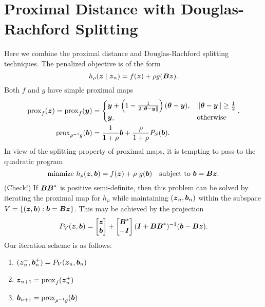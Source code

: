 \documentclass{article}
\begin{document}
\section*{\center Proximal Distance with Douglas-Rachford Splitting}
Here we combine the proximal distance and Douglas-Rachford splitting techniques.
The penalized objective is of the form
\begin{equation*}
    h_{\rho}(\boldsymbol{z} \mid \boldsymbol{z}_{n})
    =
    f(\boldsymbol{z})
    +
    \rho g(\boldsymbol{B} \boldsymbol{z}).
\end{equation*}
Both \(f\) and \(g\) have simple proximal maps
\begin{equation*}
    \begin{split}
        \mathop{\rm prox}\nolimits_{f}(\boldsymbol{z})
        =
        \mathop{\rm prox}\nolimits_{f}(\boldsymbol{y})
        &=
        \begin{cases}
            \boldsymbol{y} + \left(1 - \frac{1}{2 \|\boldsymbol{\theta} - \boldsymbol{y}\|}\right) (\boldsymbol{\theta} - \boldsymbol{y}),
                & \|\boldsymbol{\theta} - \boldsymbol{y}\| \ge \frac{1}{2} \\
            \boldsymbol{y},
                & \text{otherwise}
        \end{cases}, \\
        \mathop{\rm prox}\nolimits_{\rho^{-1} g}(\boldsymbol{b})
        &=
        \frac{1}{1 + \rho} \boldsymbol{b}
            + \frac{\rho}{1 + \rho} P_{S}(\boldsymbol{b}).
    \end{split}
\end{equation*}
In view of the splitting property of proximal maps, it is tempting to pass to the quadratic program
\begin{equation*}
    \mathrm{minmize}~h_{\rho}(\boldsymbol{z}, \boldsymbol{b}) =
        f(\boldsymbol{z}) + \rho~g(\boldsymbol{b})
    \quad \text{subject to}~\boldsymbol{b} = \boldsymbol{B} \boldsymbol{z}.
\end{equation*}
(Check!) If \(\boldsymbol{B} \boldsymbol{B}^{\ast}\) is positive semi-definite, then this problem can be solved by iterating the proximal map for \(h_{\rho}\) while maintaining \((\boldsymbol{z}_{n}, \boldsymbol{b}_{n})\) within the subspace \(V = \{(\boldsymbol{z}, \boldsymbol{b}) : \boldsymbol{b} = \boldsymbol{B} \boldsymbol{z}\}\).
This may be achieved by the projection
\begin{equation*}
    P_{V}(\boldsymbol{z}, \boldsymbol{b})
    =
    \begin{bmatrix}
        \boldsymbol{z} \\
        \boldsymbol{b}
    \end{bmatrix}
    +
    \begin{bmatrix}
        \boldsymbol{B}^{\ast} \\
        -\boldsymbol{I}
    \end{bmatrix}
    (\boldsymbol{I} + \boldsymbol{B} \boldsymbol{B}^{\ast})^{-1} (\boldsymbol{b} - \boldsymbol{B} \boldsymbol{z}).
\end{equation*}
Our iteration scheme is as follows:
\begin{enumerate}
    \item \((\boldsymbol{z}_{n}^{+}, \boldsymbol{b}_{n}^{+}) = P_{V}(\boldsymbol{z}_{n}, \boldsymbol{b}_{n})\)
    \item \(\boldsymbol{z}_{n+1} = \mathop{\rm prox}\nolimits_{f}(\boldsymbol{z}_{n}^{+})\)
    \item \(\boldsymbol{b}_{n+1} = \mathop{\rm prox}\nolimits_{\rho^{-1}g}(\boldsymbol{b})\)
\end{enumerate}
\end{document}
